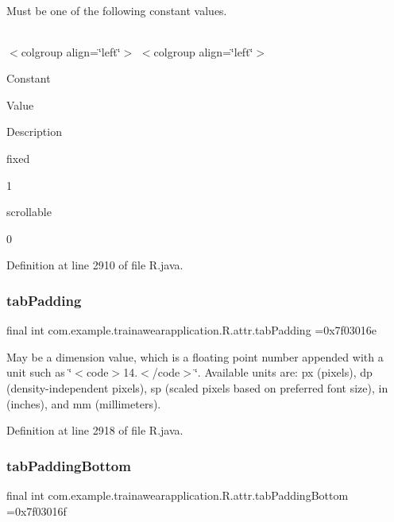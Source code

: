 Must be one of the following constant values.

\tabulinesep=1mm
\begin{longtabu}spread 0pt [c]{*{0}{|X[-1]}|}
\hline
\end{longtabu}
$<$colgroup align=\char`\"{}left\char`\"{}$>$ $<$colgroup align=\char`\"{}left\char`\"{}$>$ 

Constant

Value

Description 

fixed

1

scrollable

0

Definition at line 2910 of file R.\+java.

\mbox{\label{classcom_1_1example_1_1trainawearapplication_1_1_r_1_1attr_ae63de6153dcc2a0eabf0ee8bda16d1bd}} 
\subsubsection{\texorpdfstring{tabPadding}{tabPadding}}
{\footnotesize\ttfamily final int com.\+example.\+trainawearapplication.\+R.\+attr.\+tab\+Padding =0x7f03016e\hspace{0.3cm}{\ttfamily [static]}}

May be a dimension value, which is a floating point number appended with a unit such as \char`\"{}$<$code$>$14.\+5sp$<$/code$>$\char`\"{}. Available units are\+: px (pixels), dp (density-\/independent pixels), sp (scaled pixels based on preferred font size), in (inches), and mm (millimeters). 

Definition at line 2918 of file R.\+java.

\mbox{\label{classcom_1_1example_1_1trainawearapplication_1_1_r_1_1attr_a3f92c8446b11e2e424883e60986f32bb}} 
\subsubsection{\texorpdfstring{tabPaddingBottom}{tabPaddingBottom}}
{\footnotesize\ttfamily final int com.\+example.\+trainawearapplication.\+R.\+attr.\+tab\+Padding\+Bottom =0x7f03016f\hspace{0.3cm}{\ttfamily [static]}}

